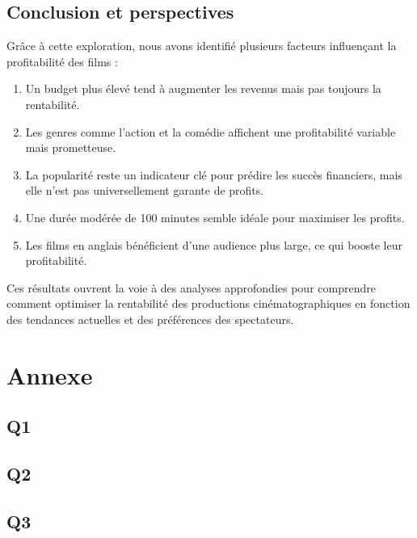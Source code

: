 \documentclass{article}
\begin{document}
\subsection*{Conclusion et perspectives}
Grâce à cette exploration, nous avons identifié plusieurs facteurs influençant la profitabilité des films :
\begin{enumerate}
	\item Un budget plus élevé tend à augmenter les revenus mais pas toujours la rentabilité.
	\item Les genres comme l’action et la comédie affichent une profitabilité variable mais prometteuse.
	\item La popularité reste un indicateur clé pour prédire les succès financiers, mais elle n’est pas universellement garante de profits.
	\item Une durée modérée de 100 minutes semble idéale pour maximiser les profits.
	\item Les films en anglais bénéficient d’une audience plus large, ce qui booste leur profitabilité.
\end{enumerate}
Ces résultats ouvrent la voie à des analyses approfondies pour comprendre comment optimiser la rentabilité des productions cinématographiques en fonction des tendances actuelles et des préférences des spectateurs.


\section{Annexe}
\subsection*{Q1}

\subsection*{Q2}

\subsection*{Q3}

	
\end{document}
